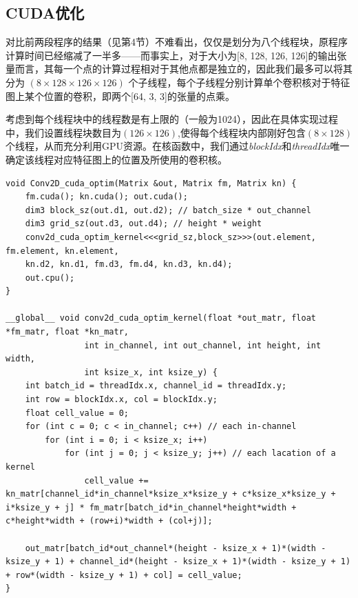 \documentclass{article}
\begin{document}
\subsection{CUDA优化}
对比前两段程序的结果（见第4节）不难看出，仅仅是划分为八个线程块，原程序计算时间已经缩减了一半多——而事实上，对于大小为[8, 128, 126, 126]的输出张量而言，其每一个点的计算过程相对于其他点都是独立的，因此我们最多可以将其分为 $(8\times128\times126\times126)$ 个子线程，每个子线程分别计算单个卷积核对于特征图上某个位置的卷积，即两个[64, 3, 3]的张量的点乘。

考虑到每个线程块中的线程数是有上限的（一般为1024），因此在具体实现过程中，我们设置线程块数目为$(126\times126)$,使得每个线程块内部刚好包含$(8\times128)$个线程，从而充分利用GPU资源。在核函数中，我们通过\textit{blockIdx}和\textit{threadIdx}唯一确定该线程对应特征图上的位置及所使用的卷积核。
\begin{lstlisting}
void Conv2D_cuda_optim(Matrix &out, Matrix fm, Matrix kn) {
	fm.cuda(); kn.cuda(); out.cuda();
	dim3 block_sz(out.d1, out.d2); // batch_size * out_channel
	dim3 grid_sz(out.d3, out.d4); // height * weight
	conv2d_cuda_optim_kernel<<<grid_sz,block_sz>>>(out.element, fm.element, kn.element, 
	kn.d2, kn.d1, fm.d3, fm.d4, kn.d3, kn.d4);
	out.cpu();
}

__global__ void conv2d_cuda_optim_kernel(float *out_matr, float *fm_matr, float *kn_matr,
				int in_channel, int out_channel, int height, int width, 
				int ksize_x, int ksize_y) {
	int batch_id = threadIdx.x, channel_id = threadIdx.y;
	int row = blockIdx.x, col = blockIdx.y;
	float cell_value = 0;
	for (int c = 0; c < in_channel; c++) // each in-channel
		for (int i = 0; i < ksize_x; i++) 
			for (int j = 0; j < ksize_y; j++) // each lacation of a kernel 
				cell_value += kn_matr[channel_id*in_channel*ksize_x*ksize_y + c*ksize_x*ksize_y + i*ksize_y + j] * fm_matr[batch_id*in_channel*height*width + c*height*width + (row+i)*width + (col+j)];

	out_matr[batch_id*out_channel*(height - ksize_x + 1)*(width - ksize_y + 1) + channel_id*(height - ksize_x + 1)*(width - ksize_y + 1) + row*(width - ksize_y + 1) + col] = cell_value;
}
\end{lstlisting}
\end{document}
